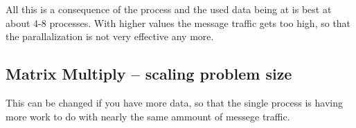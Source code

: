 \documentclass[a4paper,11pt]{scrartcl}
\begin{document}
All this is a consequence of the process and the used data being at is best at about 4-8 processes. With higher values the message traffic gets too high, so that the parallalization is not very effective any more. 
\subsection{Matrix Multiply -- scaling problem size}
This can be changed if you have more data, so that the single process is having more work to do with nearly the same ammount of messege traffic.
\end{document}

